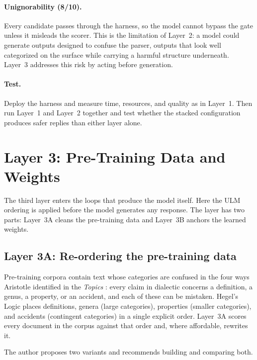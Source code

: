 \documentclass[twocolumn]{ulpaper}
\begin{document}
\paragraph{Unignorability (8/10).} Every candidate passes through the harness, so the model cannot bypass the gate unless it misleads the scorer. This is the limitation of Layer~2: a model could generate outputs designed to confuse the parser, outputs that look well categorized on the surface while carrying a harmful structure underneath. Layer~3 addresses this risk by acting before generation.

\paragraph{Test.} Deploy the harness and measure time, resources, and quality as in Layer~1. Then run Layer~1 and Layer~2 together and test whether the stacked configuration produces safer replies than either layer alone.

\section{Layer 3: Pre-Training Data and Weights}
\label{sec:layer3}

The third layer enters the loops that produce the model itself. Here the ULM ordering is applied before the model generates any response. The layer has two parts: Layer~3A cleans the pre-training data and Layer~3B anchors the learned weights.

\subsection{Layer 3A: Re-ordering the pre-training data}

Pre-training corpora contain text whose categories are confused in the four ways Aristotle identified in the \emph{Topics} \citep{aristotle_topics}: every claim in dialectic concerns a definition, a genus, a property, or an accident, and each of these can be mistaken. Hegel's Logic places definitions, genera (large categories), properties (smaller categories), and accidents (contingent categories) in a single explicit order. Layer~3A scores every document in the corpus against that order and, where affordable, rewrites it.

The author proposes two variants and recommends building and comparing both.
\end{document}
